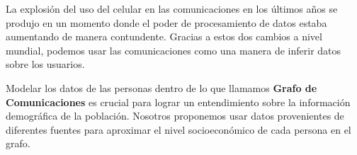 La explosión del uso del celular en las comunicaciones en los últimos años se produjo en un momento donde el poder de procesamiento de datos estaba aumentando de manera contundente. Gracias a estos dos cambios a nivel mundial, podemos usar las comunicaciones como una manera de inferir datos sobre los usuarios.

Modelar los datos de las personas dentro de lo que llamamos \textbf{Grafo de Comunicaciones} es crucial para lograr un entendimiento sobre la información demográfica de la población. Nosotros proponemos usar datos provenientes de diferentes fuentes para aproximar el nivel socioeconómico de cada persona en el grafo.